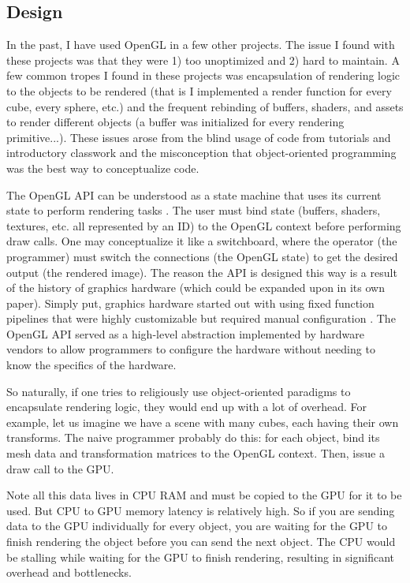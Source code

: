 \documentclass[letterpaper, 10 pt, conference]{ieeeconf}  %
\begin{document}
\subsection{Design}
In the past, I have used OpenGL in a few other projects. The issue I found with these projects was that they were 1) too unoptimized and 2) hard to maintain. A few common tropes I found in these projects was encapsulation of rendering logic to the objects to be rendered (that is I implemented a render function for every cube, every sphere, etc.) and the frequent rebinding of buffers, shaders, and assets to render different objects (a buffer was initialized for every rendering primitive...). These issues arose from the blind usage of code from tutorials and introductory classwork and the misconception that object-oriented programming was the best way to conceptualize code. 

The OpenGL API can be understood as a state machine that uses its current state to perform rendering tasks \cite{openglconcepts}. The user must bind state (buffers, shaders, textures, etc. all represented by an ID) to the OpenGL context before performing draw calls. One may conceptualize it like a switchboard, where the operator (the programmer) must switch the connections (the OpenGL state) to get the desired output (the rendered image). The reason the API is designed this way is a result of the history of graphics hardware (which could be expanded upon in its own paper). Simply put, graphics hardware started out with using fixed function pipelines that were highly customizable but required manual configuration \cite{Peddie_2022}. The OpenGL API served as a high-level abstraction implemented by hardware vendors to allow programmers to configure the hardware without needing to know the specifics of the hardware. 

So naturally, if one tries to religiously use object-oriented paradigms to encapsulate rendering logic, they would end up with a lot of overhead. For example, let us imagine we have a scene with many cubes, each having their own transforms. The naive programmer probably do this: for each object, bind its mesh data and transformation matrices to the OpenGL context. Then, issue a draw call to the GPU. 

Note all this data lives in CPU RAM and must be copied to the GPU for it to be used. But CPU to GPU memory latency is relatively high. So if you are sending data to the GPU individually for every object, you are waiting for the GPU to finish rendering the object before you can send the next object. The CPU would be stalling while waiting for the GPU to finish rendering, resulting in significant overhead and bottlenecks. 
\end{document}
